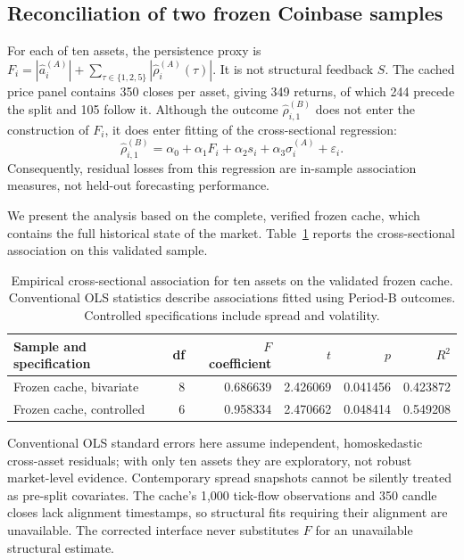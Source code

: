 \documentclass[10pt,twocolumn,letterpaper]{article}
\theoremstyle{definition}
\theoremstyle{remark}
\begin{document}
\subsection{Reconciliation of two frozen Coinbase samples}
For each of ten assets, the persistence proxy is $F_i=|\widehat a_i^{(A)}|+\sum_{\tau\in\{1,2,5\}}|\widehat\rho_i^{(A)}(\tau)|$. It is not structural feedback $S$. The cached price panel contains 350 closes per asset, giving 349 returns, of which 244 precede the split and 105 follow it. Although the outcome $\widehat\rho_{i,1}^{(B)}$ does not enter the construction of $F_i$, it does enter fitting of the cross-sectional regression:
\begin{equation}
\widehat\rho_{i,1}^{(B)}=\alpha_0+\alpha_1F_i+\alpha_2s_i+\alpha_3\sigma_i^{(A)}+\varepsilon_i.
\label{eq:empirical_reg}
\end{equation}
Consequently, residual losses from this regression are in-sample association measures, not held-out forecasting performance.

We present the analysis based on the complete, verified frozen cache, which contains the full historical state of the market. Table~\ref{tab:empirical_reg} reports the cross-sectional association on this validated sample.
\begin{table}[htbp]\centering\small
\caption{Empirical cross-sectional association for ten assets on the validated frozen cache. Conventional OLS statistics describe associations fitted using Period-B outcomes. Controlled specifications include spread and volatility.}
\label{tab:empirical_reg}
\begin{tabular}{lrrrrr}\toprule
Sample and specification & df & $F$ coefficient & $t$ & $p$ & $R^2$\\\midrule
Frozen cache, bivariate & 8 & 0.686639 & 2.426069 & 0.041456 & 0.423872 \\
Frozen cache, controlled & 6 & 0.958334 & 2.470662 & 0.048414 & 0.549208 \\
\bottomrule\end{tabular}\end{table}

Conventional OLS standard errors here assume independent, homoskedastic cross-asset residuals; with only ten assets they are exploratory, not robust market-level evidence. Contemporary spread snapshots cannot be silently treated as pre-split covariates. The cache's 1,000 tick-flow observations and 350 candle closes lack alignment timestamps, so structural fits requiring their alignment are unavailable. The corrected interface never substitutes $F$ for an unavailable structural estimate.
\end{document}
